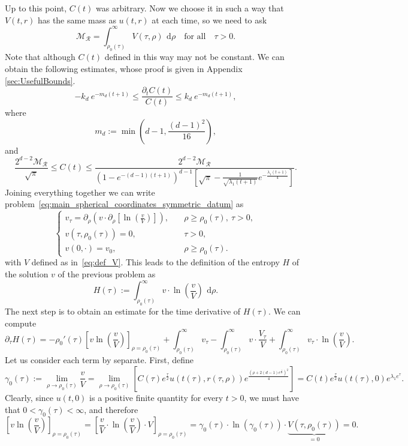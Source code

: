 \documentclass[12pt,longbibliography]{article}
\def\d{\,\mathrm{d}}
\def\d{\,\mathrm{d}}
\theoremstyle{definition}
\theoremstyle{remark}
\theoremstyle{example}
\begin{document}
Up to this point, $C(t)$ was arbitrary. Now we choose it in such a way that $V(t,r)$ has the same mass as $u(t,r)$ at each time, so we need to ask
\begin{equation}\label{eq_definC}
\mathcal{M}_{\mathcal{R}} = \int_{\rho_0(\tau)}^\infty V(\tau, \rho)\ \d \rho\quad\text{for all}\quad \tau>0.
\end{equation}
Note that although $C(t)$ defined in this way may not be constant. We can obtain the following estimates, whose proof is given in Appendix \ref{sec:UsefulBounds}.
	\begin{equation}\label{eq:bound_quotient_C(t)}
	-k_d\  e^{-m_d (t+1)}\leq \frac{\partial_t C(t)}{C(t)}\leq k_d\  e^{-m_d (t+1)},
\end{equation}
where
\[
m_d := \min \left(d-1, \frac{(d-1)^2}{16}\right),
\]
and
\begin{equation}\label{eq:limit_C(t)}
	\frac{2^{d-2}\mathcal{M}_{\mathcal{R}}}{\sqrt{\pi} }\leq C(t)\leq \frac{2^{d-2}\mathcal{M}_{\mathcal{R}}}{(1-e^{-(d-1)(t+1)})^{d-1}\left[\sqrt{\pi} - \frac{1}{\sqrt{\lambda_1 (t+1)}}e^{-\frac{\lambda_1 (t+1)}{4}}\right]}.
\end{equation}
Joining everything together we can write problem~\eqref{eq:main_spherical_coordinates_symmetric_datum} as
\[
	\begin{cases}
		v_\tau = \partial_\rho\left(v\cdot\partial_\rho\left[\ln\left(\frac{v}{V}\right)\right]\right),\quad &\rho\geq \rho_0(\tau),\ \tau>0,\\
		v(\tau, \rho_0(\tau))=0, &\tau>0,\\
		v(0,\cdot) = v_0, &\rho\geq \rho_0(\tau).
	\end{cases}
\]
with $V$ defined as in~\eqref{eq:def_V}. This leads to the definition of the entropy $H$ of the solution $v$ of the previous problem as
\[
H(\tau):= \int_{\rho_0(\tau)}^\infty v\cdot\ln\left(\frac{v}{V}\right)\ \d \rho.
\]
The next step is to obtain an estimate for the time derivative of $H(\tau)$. We can compute
\[
\partial_\tau H(\tau) = -\rho_0'(\tau)\left[v\ln\left(\frac{v}{V}\right)\right]_{\rho=\rho_0(\tau)} +\int_{\rho_0(\tau)}^\infty v_\tau - \int_{\rho_0(\tau)}^\infty v\cdot\frac{V_\tau}{V} + \int_{\rho_0(\tau)}^\infty v_\tau \cdot\ln\left(\frac{v}{V}\right).
\]
Let us consider each term by separate. First, define
\[
\gamma_0(\tau):=\lim\limits_{\rho\to\rho_0(\tau)} \frac{v}{V}= \lim\limits_{\rho\to\rho_0(\tau)}\left[ C(\tau)e^\frac{\tau}{2}u(t(\tau),r(\tau, \rho))e^{\frac{\left(\rho+2(d-1)e^\frac{\tau}{2}\right)^2}{4}}\right]= C(t)e^\frac{\tau}{2}u(t(\tau),0)e^{\lambda_1 e^\tau}.
\]
Clearly, since $u(t,0)$ is a positive finite quantity for every $t> 0$, we must have that $0<\gamma_0(\tau)<\infty$, and therefore
\[
\left[v\ln\left(\frac{v}{V}\right)\right]_{\rho=\rho_0(\tau)} = \left[\frac{v}{V}\cdot\ln\left(\frac{v}{V}\right)\cdot V\right]_{\rho=\rho_0(\tau)}=\gamma_0(\tau)\cdot \ln(\gamma_0(\tau))\cdot \underbrace{V(\tau, \rho_0(\tau))}_{=0}= 0.
\]
\end{document}
